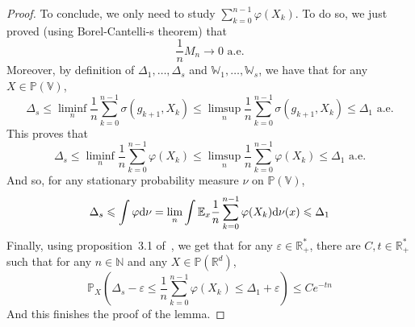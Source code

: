 \documentclass[11pt]{amsart}
\theoremstyle{definition}
\theoremstyle{remark}
\numberwithin{equation}{section}
\begin{document}
\begin{proof}
To conclude, we only need to study $\sum_{k=0}^{n-1} \varphi(X_k)$. To do so, we just proved (using Borel-Cantelli-s theorem) that
\[
\frac 1 n M_n \xrightarrow\, 0 \text{ a.e.}
\]
Moreover, by definition of $\Delta_1, \dots , \Delta_s$ and ${\mathbb W}_1, \dots ,{\mathbb W}_s$, we have that for any $X\in {\mathbb P}({\mathbb V})$,
\[
\Delta_s \leqslant \liminf_n \frac 1 n \sum_{k=0}^{n-1} \sigma(g_{k+1}, X_k) \leqslant \limsup_n \frac 1 n \sum_{k=0}^{n-1} \sigma(g_{k+1}, X_k) \leqslant \Delta_1 \text{ a.e.}
\]
This proves that
\[
\Delta_s \leqslant \liminf_n \frac 1 n \sum_{k=0}^{n-1} \varphi(X_k) \leqslant \limsup_n \frac 1 n \sum_{k=0}^{n-1} \varphi(X_k) \leqslant\Delta_1 \text{ a.e.}
\]
And so, for any stationary probability measure $\nu$ on ${\mathbb P}({\mathbb V})$,
\[
\Delta_s \leqslant\int \varphi {{\rm d}}\nu = \lim_n \int {\mathbb E}_x \frac 1 n \sum_{k=0}^{n-1} \varphi(X_k) {{\rm d}}\nu(x) \leqslant \Delta_1
\]
Finally, using proposition~3.1 of~\cite{BQlin}, we get that for any $\varepsilon \in {\mathbb R}_+^\ast$, there are $C,t\in {\mathbb R}_+^\ast$ such that for any $n\in {\mathbb N}$ and any $X\in {\mathbb P}({\mathbb R}^d)$,
\[
{\mathbb P}_X\left( \Delta_s - \varepsilon \leqslant\frac 1 n\sum_{k=0}^{n-1} \varphi(X_k) \leqslant \Delta_1+ \varepsilon  \right)\leqslant Ce^{-tn}
\]
And this finishes the proof of the lemma.
\end{proof}
\end{document}
